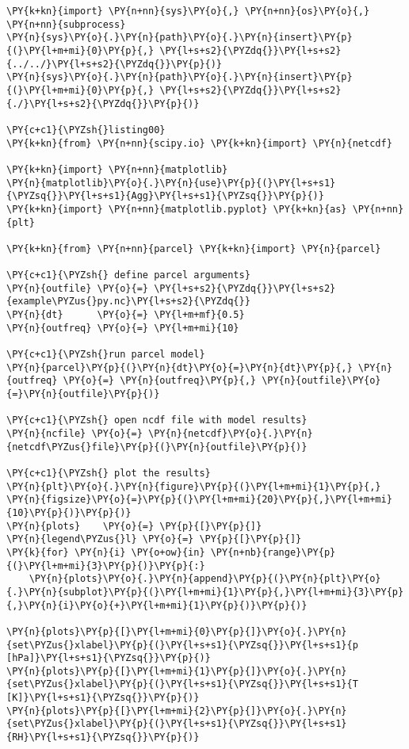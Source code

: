 \begin{Verbatim}[commandchars=\\\{\}]
\PY{k+kn}{import} \PY{n+nn}{sys}\PY{o}{,} \PY{n+nn}{os}\PY{o}{,} \PY{n+nn}{subprocess}
\PY{n}{sys}\PY{o}{.}\PY{n}{path}\PY{o}{.}\PY{n}{insert}\PY{p}{(}\PY{l+m+mi}{0}\PY{p}{,} \PY{l+s+s2}{\PYZdq{}}\PY{l+s+s2}{../../}\PY{l+s+s2}{\PYZdq{}}\PY{p}{)}
\PY{n}{sys}\PY{o}{.}\PY{n}{path}\PY{o}{.}\PY{n}{insert}\PY{p}{(}\PY{l+m+mi}{0}\PY{p}{,} \PY{l+s+s2}{\PYZdq{}}\PY{l+s+s2}{./}\PY{l+s+s2}{\PYZdq{}}\PY{p}{)}

\PY{c+c1}{\PYZsh{}listing00}
\PY{k+kn}{from} \PY{n+nn}{scipy.io} \PY{k+kn}{import} \PY{n}{netcdf}

\PY{k+kn}{import} \PY{n+nn}{matplotlib}
\PY{n}{matplotlib}\PY{o}{.}\PY{n}{use}\PY{p}{(}\PY{l+s+s1}{\PYZsq{}}\PY{l+s+s1}{Agg}\PY{l+s+s1}{\PYZsq{}}\PY{p}{)}
\PY{k+kn}{import} \PY{n+nn}{matplotlib.pyplot} \PY{k+kn}{as} \PY{n+nn}{plt}

\PY{k+kn}{from} \PY{n+nn}{parcel} \PY{k+kn}{import} \PY{n}{parcel}

\PY{c+c1}{\PYZsh{} define parcel arguments}
\PY{n}{outfile} \PY{o}{=} \PY{l+s+s2}{\PYZdq{}}\PY{l+s+s2}{example\PYZus{}py.nc}\PY{l+s+s2}{\PYZdq{}}
\PY{n}{dt}      \PY{o}{=} \PY{l+m+mf}{0.5}
\PY{n}{outfreq} \PY{o}{=} \PY{l+m+mi}{10}

\PY{c+c1}{\PYZsh{}run parcel model}
\PY{n}{parcel}\PY{p}{(}\PY{n}{dt}\PY{o}{=}\PY{n}{dt}\PY{p}{,} \PY{n}{outfreq} \PY{o}{=} \PY{n}{outfreq}\PY{p}{,} \PY{n}{outfile}\PY{o}{=}\PY{n}{outfile}\PY{p}{)}

\PY{c+c1}{\PYZsh{} open ncdf file with model results}
\PY{n}{ncfile} \PY{o}{=} \PY{n}{netcdf}\PY{o}{.}\PY{n}{netcdf\PYZus{}file}\PY{p}{(}\PY{n}{outfile}\PY{p}{)}

\PY{c+c1}{\PYZsh{} plot the results}
\PY{n}{plt}\PY{o}{.}\PY{n}{figure}\PY{p}{(}\PY{l+m+mi}{1}\PY{p}{,} \PY{n}{figsize}\PY{o}{=}\PY{p}{(}\PY{l+m+mi}{20}\PY{p}{,}\PY{l+m+mi}{10}\PY{p}{)}\PY{p}{)}
\PY{n}{plots}    \PY{o}{=} \PY{p}{[}\PY{p}{]}
\PY{n}{legend\PYZus{}l} \PY{o}{=} \PY{p}{[}\PY{p}{]}
\PY{k}{for} \PY{n}{i} \PY{o+ow}{in} \PY{n+nb}{range}\PY{p}{(}\PY{l+m+mi}{3}\PY{p}{)}\PY{p}{:}
    \PY{n}{plots}\PY{o}{.}\PY{n}{append}\PY{p}{(}\PY{n}{plt}\PY{o}{.}\PY{n}{subplot}\PY{p}{(}\PY{l+m+mi}{1}\PY{p}{,}\PY{l+m+mi}{3}\PY{p}{,}\PY{n}{i}\PY{o}{+}\PY{l+m+mi}{1}\PY{p}{)}\PY{p}{)}

\PY{n}{plots}\PY{p}{[}\PY{l+m+mi}{0}\PY{p}{]}\PY{o}{.}\PY{n}{set\PYZus{}xlabel}\PY{p}{(}\PY{l+s+s1}{\PYZsq{}}\PY{l+s+s1}{p [hPa]}\PY{l+s+s1}{\PYZsq{}}\PY{p}{)}
\PY{n}{plots}\PY{p}{[}\PY{l+m+mi}{1}\PY{p}{]}\PY{o}{.}\PY{n}{set\PYZus{}xlabel}\PY{p}{(}\PY{l+s+s1}{\PYZsq{}}\PY{l+s+s1}{T [K]}\PY{l+s+s1}{\PYZsq{}}\PY{p}{)}
\PY{n}{plots}\PY{p}{[}\PY{l+m+mi}{2}\PY{p}{]}\PY{o}{.}\PY{n}{set\PYZus{}xlabel}\PY{p}{(}\PY{l+s+s1}{\PYZsq{}}\PY{l+s+s1}{RH}\PY{l+s+s1}{\PYZsq{}}\PY{p}{)}


\end{Verbatim}

